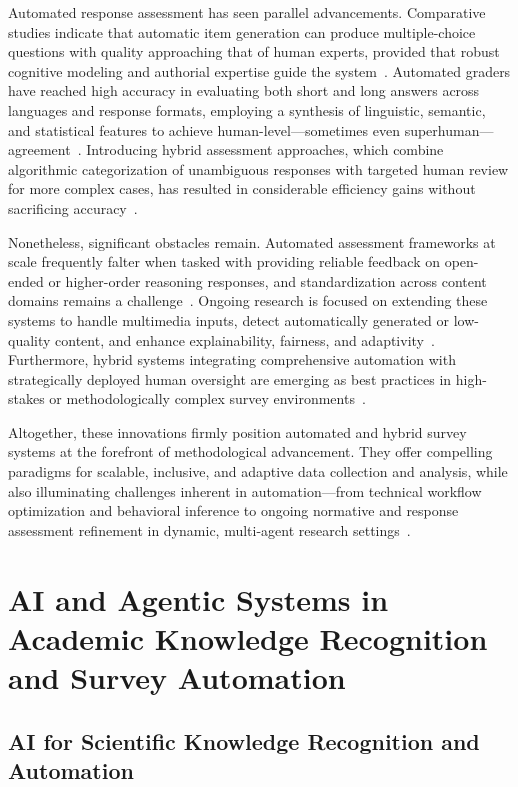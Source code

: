 Automated response assessment has seen parallel advancements. Comparative studies indicate that automatic item generation can produce multiple-choice questions with quality approaching that of human experts, provided that robust cognitive modeling and authorial expertise guide the system~\cite{ref2}. Automated graders have reached high accuracy in evaluating both short and long answers across languages and response formats, employing a synthesis of linguistic, semantic, and statistical features to achieve human-level—sometimes even superhuman—agreement~\cite{ref50,ref90}. Introducing hybrid assessment approaches, which combine algorithmic categorization of unambiguous responses with targeted human review for more complex cases, has resulted in considerable efficiency gains without sacrificing accuracy~\cite{ref86,ref88}.

Nonetheless, significant obstacles remain. Automated assessment frameworks at scale frequently falter when tasked with providing reliable feedback on open-ended or higher-order reasoning responses, and standardization across content domains remains a challenge~\cite{ref1,ref2,ref44,ref50}. Ongoing research is focused on extending these systems to handle multimedia inputs, detect automatically generated or low-quality content, and enhance explainability, fairness, and adaptivity~\cite{ref97,ref104,ref40,ref39,ref84}. Furthermore, hybrid systems integrating comprehensive automation with strategically deployed human oversight are emerging as best practices in high-stakes or methodologically complex survey environments~\cite{ref88,ref50,ref72}.

Altogether, these innovations firmly position automated and hybrid survey systems at the forefront of methodological advancement. They offer compelling paradigms for scalable, inclusive, and adaptive data collection and analysis, while also illuminating challenges inherent in automation—from technical workflow optimization and behavioral inference to ongoing normative and response assessment refinement in dynamic, multi-agent research settings~\cite{ref1,ref2,ref3,ref17,ref18,ref39,ref40,ref44,ref48,ref50,ref72,ref84,ref86,ref88,ref89,ref90,ref96,ref97,ref104,ref117}.

\section{AI and Agentic Systems in Academic Knowledge Recognition and Survey Automation}

\subsection{AI for Scientific Knowledge Recognition and Automation}

